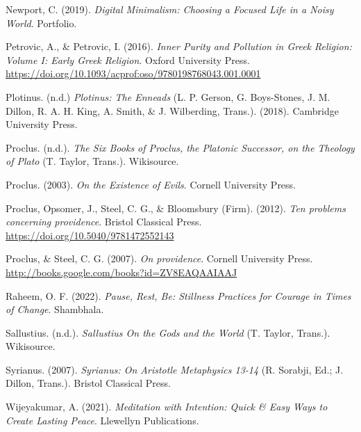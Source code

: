 \documentclass[
]{book}
\begin{document}
Newport, C. (2019). \emph{Digital Minimalism: Choosing a Focused Life in a Noisy World}. Portfolio.

Petrovic, A., \& Petrovic, I. (2016). \emph{Inner Purity and Pollution in Greek Religion: Volume I: Early Greek Religion}. Oxford University Press. \url{https://doi.org/10.1093/acprof:oso/9780198768043.001.0001}

Plotinus. (n.d.) \emph{Plotinus: The Enneads} (L. P. Gerson, G. Boys-Stones, J. M. Dillon, R. A. H. King, A. Smith, \& J. Wilberding, Trans.). (2018). Cambridge University Press.

Proclus. (n.d.). \emph{The Six Books of Proclus, the Platonic Successor, on the Theology of Plato} (T. Taylor, Trans.). Wikisource.

Proclus. (2003). \emph{On the Existence of Evils}. Cornell University Press.

Proclus, Opsomer, J., Steel, C. G., \& Bloomsbury (Firm). (2012). \emph{Ten problems concerning providence}. Bristol Classical Press. \url{https://doi.org/10.5040/9781472552143}

Proclus, \& Steel, C. G. (2007). \emph{On providence}. Cornell University Press. \url{http://books.google.com/books?id=ZV8EAQAAIAAJ}

Raheem, O. F. (2022). \emph{Pause, Rest, Be: Stillness Practices for Courage in Times of Change}. Shambhala.

Sallustius. (n.d.). \emph{Sallustius On the Gods and the World} (T. Taylor, Trans.). Wikisource.

Syrianus. (2007). \emph{Syrianus: On Aristotle Metaphysics 13-14} (R. Sorabji, Ed.; J. Dillon, Trans.). Bristol Classical Press.

Wijeyakumar, A. (2021). \emph{Meditation with Intention: Quick \& Easy Ways to Create Lasting Peace}. Llewellyn Publications.
\end{document}

